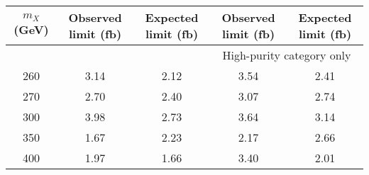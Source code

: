 \begin{tabular}{ | c || c | c || c | c |}
\hline
$m_X$ (GeV) & Observed limit (fb) & Expected limit (fb) & Observed limit (fb) & Expected limit (fb) \\ \hline
 & & &  \multicolumn{2}{c|}{High-purity category only} \\ \hline
260 & 3.14 & 2.12 & 3.54 & 2.41 \\
270 & 2.70 & 2.40 & 3.07 & 2.74 \\
300 & 3.98 & 2.73 & 3.64 & 3.14 \\
350 & 1.67 & 2.23 & 2.17 & 2.66 \\
400 & 1.97 & 1.66 & 3.40 & 2.01 \\ \hline
\end{tabular}
